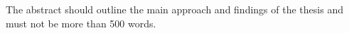 
The abstract should outline the main approach and findings of the thesis and must not be more than 500 words.

